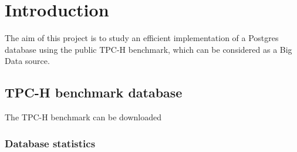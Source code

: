 

\section{Introduction}

The aim of this project is to study an efficient implementation of a Postgres database using the public TPC-H benchmark, which can be considered as a Big Data source.

\subsection{TPC-H benchmark database}

The TPC-H benchmark can be downloaded

\subsubsection{Database statistics}

